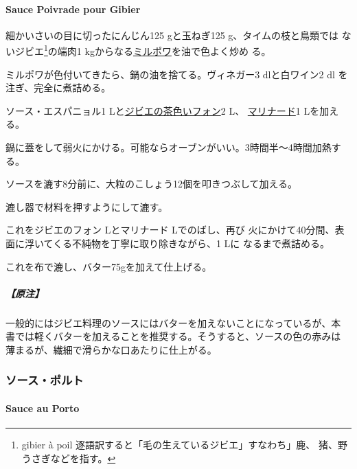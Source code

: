 \hypertarget{sauce-poivrade-pour-gibier}{%
\paragraph{Sauce Poivrade pour
Gibier}\label{sauce-poivrade-pour-gibier}}

  

細かいさいの目に切ったにんじん125 gと玉ねぎ125 g、タイムの枝と鳥類では
ないジビエ\footnote{gibier à poil
  逐語訳すると「毛の生えているジビエ」すなわち」鹿、
  猪、野うさぎなどを指す。}の端肉1
kgからなる\protect\hyperlink{mirepoix}{ミルポワ}を油で色よく炒め る。

ミルポワが色付いてきたら、鍋の油を捨てる。ヴィネガー3 dlと白ワイン2 dl
を注ぎ、完全に煮詰める。

ソース・エスパニョル1
Lと\protect\hyperlink{fonds-de-gibier}{ジビエの茶色いフォン}2 L、
\href{}{マリナード}1 Lを加える。

鍋に蓋をして弱火にかける。可能ならオーブンがいい。3時間半〜4時間加熱す
る。

ソースを漉す8分前に、大粒のこしょう12個を叩きつぶして加える。

漉し器で材料を押すようにして漉す。

これをジビエのフォン\unquart{} Lとマリナード\unquart{} Lでのばし、再び
火にかけて40分間、表面に浮いてくる不純物を丁寧に取り除きながら、1 Lに
なるまで煮詰める。

これを布で漉し、バター75gを加えて仕上げる。

\hypertarget{ux539fux6ce8-6}{%
\subparagraph{【原注】}\label{ux539fux6ce8-6}}

一般的にはジビエ料理のソースにはバターを加えないことになっているが、本
書では軽くバターを加えることを推奨する。そうすると、ソースの色の赤みは
薄まるが、繊細で滑らかな口あたりに仕上がる。

\maeaki

\hypertarget{ux30bdux30fcux30b9ux30ddux30ebux30c8}{%
\subsubsection{ソース・ポルト}\label{ux30bdux30fcux30b9ux30ddux30ebux30c8}}

\hypertarget{sauce-au-porto}{%
\paragraph{Sauce au Porto}\label{sauce-au-porto}}


